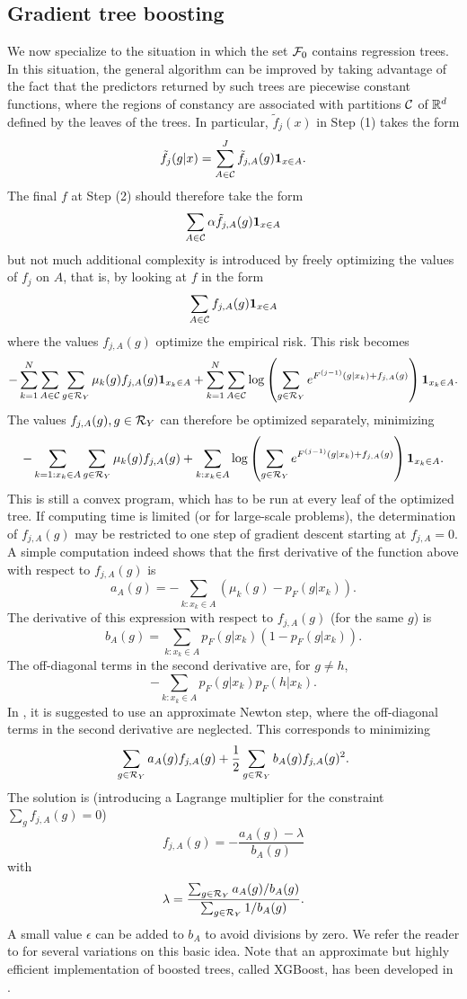  
\subsection{Gradient tree boosting}

We now specialize to the situation in which the set ${\mathcal F}_0$ contains regression trees. In this situation, the general algorithm can be improved by taking advantage of the fact that the predictors returned by such trees are piecewise constant functions, where the regions of constancy are associated with partitions ${\mathcal C}$ of ${\mathbb{R}}^d$ defined by the leaves of the trees. In particular, $\tilde{f}_j(x)$ in Step (1) takes the form
\[
\tilde f_j(g|x) = \sum_{A\in {\mathcal C}}^J \tilde f_{j,A}(g) {\bm 1}_{x\in A}.
\]
The final $f$ at Step (2) should therefore take the form
\[
\sum_{A\in{\mathcal C}} \alpha \tilde f_{j,A}(g) {\bm 1}_{x\in A}
\]
but not much additional complexity is introduced by freely optimizing the values of $f_j$ on $A$, that is, by looking at $f$ in the form 
\[
\sum_{A\in{\mathcal C}} f_{j,A}(g) {\bm 1}_{x\in A}
\]
where the values $f_{j,A}(g)$ optimize the empirical risk. This risk becomes
\[
- \sum_{k=1}^N \sum_{A\in{\mathcal C}} \sum_{g\in {\mathcal R}_Y} \mu_k(g) f_{j,A}(g) {\bm 1}_{x_k\in A} + \sum_{k=1}^N \sum_{A\in{\mathcal C}} \log\left(\sum_{g\in {\mathcal R}_Y}  e^{F^{(j-1)}(g|x_k) +   f_{j,A}(g)}\right) {\bm 1}_{x_k\in A}.
\]
The values $f_{j,A}(g), g\in {\mathcal R}_Y$ can therefore be optimized separately, minimizing
\[
- \sum_{k=1: x_k\in A}  \sum_{g\in {\mathcal R}_Y} \mu_k(g) f_{j,A}(g)  + \sum_{k: x_k\in A} \log\left(\sum_{g\in {\mathcal R}_Y}  e^{F^{(j-1)}(g|x_k) +   f_{j,A}(g)}\right) {\bm 1}_{x_k\in A}.
\]
This is still a convex program, which has to be run at every leaf of the optimized tree. If computing time is limited (or for large-scale problems), the determination of $f_{j,A}(g)$ may be restricted to one step of gradient descent starting at $f_{j,A} = 0$. A simple computation indeed shows that the first derivative of the function above with respect to $f_{j,A}(g)$ is
\[
a_A(g) = - \sum_{k: x_k\in A} (\mu_k(g) - p_F(g|x_k)).
\]
The derivative of this expression with respect to $f_{j,A}(g)$ (for the same $g$) is
\[
b_A(g) = \sum_{k: x_k\in A} p_F(g|x_k)(1-p_F(g|x_k)).
\]
The off-diagonal terms in the second derivative are, for $g\neq h$,
\[
- \sum_{k: x_k\in A} p_F(g|x_k)p_F(h|x_k).
\]
In \citet{friedman2000additive}, it is suggested to use an approximate Newton step, where the off-diagonal terms in the second derivative are neglected. This corresponds to minimizing 
\[
\sum_{g\in {\mathcal R}_Y} a_A(g) f_{j,A}(g) + \frac12 \sum_{g\in{\mathcal R}_Y}  b_A(g) f_{j,A}(g)^2.
\]
The solution is (introducing a Lagrange multiplier for the constraint $\sum_g f_{j,A}(g) = 0$)
\[
f_{j,A}(g) = -  \frac{a_A(g) - \lambda}{b_A(g)}
\]
with
\[
\lambda = \frac{\sum_{g\in{\mathcal R}_Y} a_A(g)/b_A(g)}{\sum_{g\in{\mathcal R}_Y} 1/b_A(g)}.
\]
A small value $\epsilon$ can be added to $b_A$ to avoid divisions by zero. We refer the reader to \citet{friedman2000additive,friedman2001greedy,htf03} for several variations on this basic idea. Note that an approximate but highly efficient implementation of boosted trees, called XGBoost, has been developed in \citet{chen2016xgboost}.

